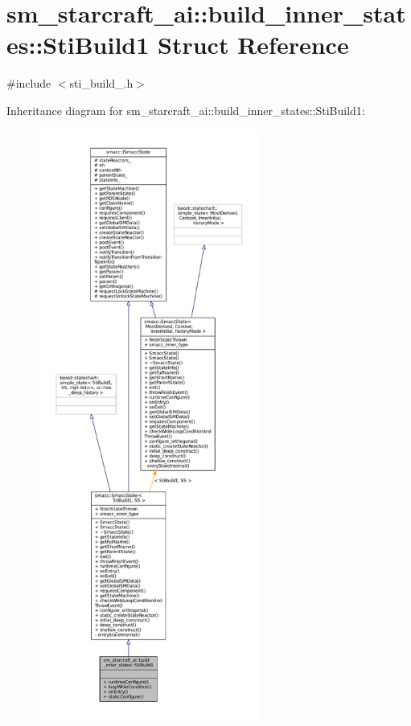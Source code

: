 \hypertarget{structsm__starcraft__ai_1_1build__inner__states_1_1StiBuild1}{}\section{sm\+\_\+starcraft\+\_\+ai\+:\+:build\+\_\+inner\+\_\+states\+:\+:Sti\+Build1 Struct Reference}
\label{structsm__starcraft__ai_1_1build__inner__states_1_1StiBuild1}


{\ttfamily \#include $<$sti\+\_\+build\+\_.\+h$>$}



Inheritance diagram for sm\+\_\+starcraft\+\_\+ai\+:\+:build\+\_\+inner\+\_\+states\+:\+:Sti\+Build1\+:
\nopagebreak
\begin{figure}[H]
\begin{center}
\leavevmode
\includegraphics[height=550pt]{structsm__starcraft__ai_1_1build__inner__states_1_1StiBuild1__inherit__graph}
\end{center}
\end{figure}


